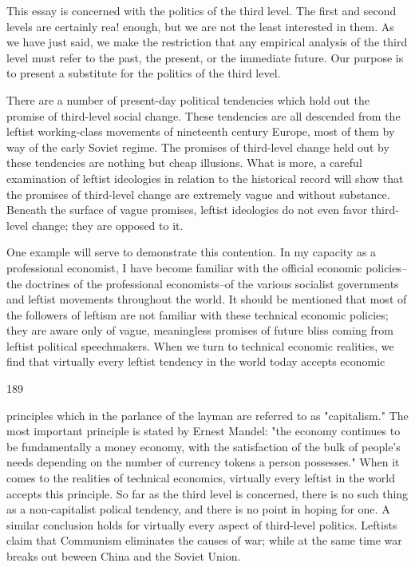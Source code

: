 \documentclass[10pt,twoside]{memoir}
\begin{document}
\begin{enumerate}
{{{This essay is concerned with the politics of the third level. The first and 
second levels are certainly rea! enough, but we are not the least interested in 
them. As we have just said, we make the restriction that any empirical 
analysis of the third level must refer to the past, the present, or the 
immediate future. Our purpose is to present a substitute for the politics of 
the third level. 

There are a number of present-day political tendencies which hold out 
the promise of third-level social change. These tendencies are all descended 
from the leftist working-class movements of nineteenth century Europe, 
most of them by way of the early Soviet regime. The promises of third-level 
change held out by these tendencies are nothing but cheap illusions. What is 
more, a careful examination of leftist ideologies in relation to the historical 
record will show that the promises of third-level change are extremely vague 
and without substance. Beneath the surface of vague promises, leftist 
ideologies do not even favor third-level change; they are opposed to it. 

One example will serve to demonstrate this contention. In my capacity 
as a professional economist, I have become familiar with the official 
economic policies--the doctrines of the professional economists--of the 
various socialist governments and leftist movements throughout the world. It 
should be mentioned that most of the followers of leftism are not familiar 
with these technical economic policies; they are aware only of vague, 
meaningless promises of future bliss coming from leftist political 
speechmakers. When we turn to technical economic realities, we find that 
virtually every leftist tendency in the world today accepts economic 


189 


principles which in the parlance of the layman are referred to as 
"capitalism." The most important principle is stated by Ernest Mandel: "the 
economy continues to be fundamentally a money economy, with the 
satisfaction of the bulk of people's needs depending on the number of 
currency tokens a person possesses." When it comes to the realities of 
technical economics, virtually every leftist in the world accepts this 
principle. So far as the third level is concerned, there is no such thing as a 
non-capitalist polical tendency, and there is no point in hoping for one. A 
similar conclusion holds for virtually every aspect of third-level politics. 
Leftists claim that Communism eliminates the causes of war; while at the 
same time war breaks out beween China and the Soviet Union. 

}}}
\end{enumerate}
\end{document}
